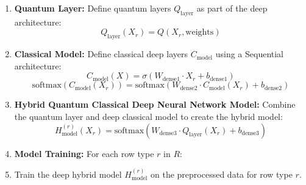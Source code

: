 \documentclass[a4paper]{article}
\begin{document}
\begin{enumerate}[label=\arabic*.]
\item \textbf{Quantum Layer:}
	Define quantum layers $Q_{\text{layer}}$ as part of the deep architecture:
	\[Q_{\text{layer}}(X_r) = Q(X_r, \text{weights})\]
			
	\item \textbf{Classical Model:}
	Define classical deep layers $C_{\text{model}}$ using a Sequential architecture:
	\[ C_{\text{model}}(X) = \sigma(W_{\text{dense1}} \cdot X_r + b_{\text{dense1}}) \]
	\[\text{softmax}(C_{\text{model}}(X_r)) = \text{softmax}(W_{\text{dense2}} \cdot C_{\text{model}}(X_r) + b_{\text{dense2}})\]
				
	\item \textbf{Hybrid Quantum Classical Deep Neural Network Model:}
	Combine the quantum layer and deep classical model to create the  hybrid model:
	\[ H_{\text{model}}^{(r)}(X_r) = \text{softmax}(W_{\text{dense3}} \cdot Q_{\text{layer}}(X_r) + b_{\text{dense3}}) \]
	\item \textbf{Model Training:}
	For each row type $r$ in $R$: 
	\item[] Train the deep hybrid model $H_{\text{model}}^{(r)}$ on the preprocessed data for row type $r$.
	

\end{enumerate}
\end{document}
